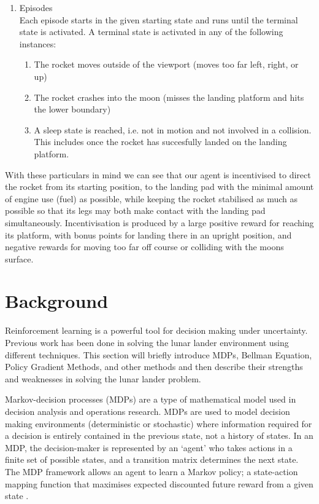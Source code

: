 \documentclass{article}
\begin{document}
\begin{enumerate}
  \item Episodes\\
  Each episode starts in the given starting state and runs until the terminal state is activated. A terminal state is activated in any of the following instances:
  \begin{enumerate}
    \item The rocket moves outside of the viewport (moves too far left, right, or up)
    \item The rocket crashes into the moon (misses the landing platform and hits the lower boundary)
    \item A sleep state is reached, i.e. not in motion and not involved in a collision. This includes once the rocket has succesfully landed on the landing platform.
  \end{enumerate}
\end{enumerate}

With these particulars in mind we can see that our agent is incentivised to direct the rocket from its starting position, to the landing pad with the minimal amount of engine use (fuel) as possible, while keeping the rocket stabilised as much as possible so that its legs may both make contact with the landing pad simultaneously. Incentivisation is produced by a large positive reward for reaching its platform, with bonus points for landing there in an upright position, and negative rewards for moving too far off course or colliding with the moons surface.


\section{Background}
Reinforcement learning is a powerful tool for decision making under uncertainty. Previous work has been done in solving the lunar lander environment using different techniques. This section will briefly introduce MDPs, Bellman Equation, Policy Gradient Methods, and other methods and then describe their strengths and weaknesses in solving the lunar lander problem.

Markov-decision processes (MDPs) are a type of mathematical model used in decision analysis and operations research. MDPs are used to model decision making environments (deterministic or stochastic) where information required for a decision is entirely contained in the previous state, not a history of states. In an MDP, the decision-maker is represented by an `agent' who takes actions in a finite set of possible states, and a transition matrix determines the next state. The MDP framework allows an agent to learn a Markov policy; a state-action mapping function that maximises expected discounted future reward from a given state \citep{sutton1999between}.
\end{document}
